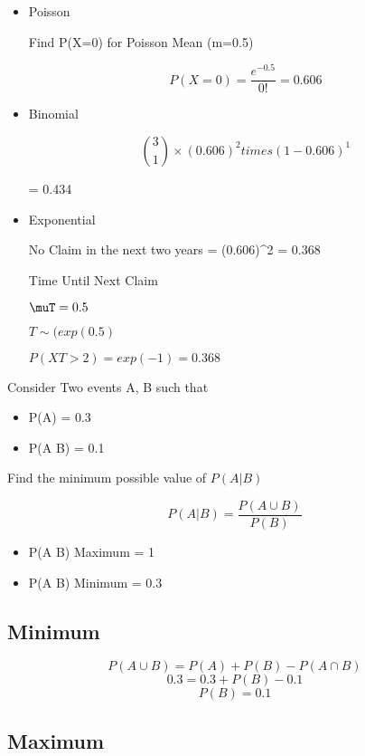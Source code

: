 \begin{itemize}
\item  Poisson

Find P(X=0) for Poisson Mean (m=0.5)


\[ P(X=0) = \frac{e^{-0.5}}{0!}  = 0.606 \]


\item Binomial

\[ { 3 \choose 1} \times (0.606)^2 times (1-0.606)^1 \]

= 0.434

\item Exponential

No Claim in the next two years
= (0.606)^2 = 0.368

Time Until Next Claim

$\muT = 0.5$

$T \sim (exp(0.5)$

$P(XT >2) = exp(-1) = 0.368$

\end{itemize}

Consider Two events A, B such that

\begin{itemize}
\item P(A) = 0.3
\item P(A \cap B) = 0.1
\end{itemize}

Find the minimum possible value of $P(A|B)$

\[ P(A|B) = \frac{P(A \cup B) }{P(B)}\]

\begin{itemize}
\item P(A \cup B) Maximum = 1
\item P(A \cup B) Minimum = 0.3
\end{itemize}

\subsection*{Minimum}

\[ P(A \cup B) = P(A) + P(B) - P(A \cap B)\]
\[ 0.3 = 0.3 + P(B) - 0.1 \]
\[ P(B) = 0.1\] 

\subsection*{Maximum}

